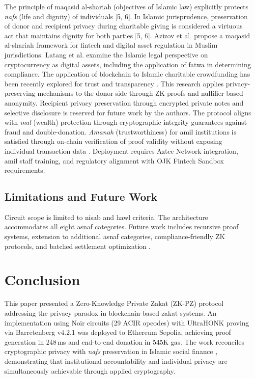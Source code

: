 \documentclass[conference]{IEEEtran}
\begin{document}
The principle of maqasid al-shariah (objectives of Islamic law) explicitly protects \textit{nafs} (life and dignity) of individuals [5, 6]. In Islamic jurisprudence, preservation of donor and recipient privacy during charitable giving is considered a virtuous act that maintains dignity for both parties [5, 6]. Azizov et al. \cite{b_maqasid_fintech} propose a maqasid al-shariah framework for fintech and digital asset regulation in Muslim jurisdictions. Latang et al. \cite{b_fatwa_crypto} examine the Islamic legal perspective on cryptocurrency as digital assets, including the application of fatwa in determining compliance. The application of blockchain to Islamic charitable crowdfunding has been recently explored for trust and transparency \cite{b_icf_blockchain}. This research applies privacy-preserving mechanisms to the donor side through ZK proofs and nullifier-based anonymity. Recipient privacy preservation through encrypted private notes and selective disclosure is reserved for future work by the authors. The protocol aligns with \textit{mal} (wealth) protection through cryptographic integrity guarantees against fraud and double-donation. \textit{Amanah} (trustworthiness) for amil institutions is satisfied through on-chain verification of proof validity without exposing individual transaction data \cite{b_zakat_transparency}. Deployment requires Aztec Network integration, amil staff training, and regulatory alignment with OJK Fintech Sandbox requirements.

\subsection{Limitations and Future Work}

Circuit scope is limited to nisab and hawl criteria. The architecture accommodates all eight asnaf categories. Future work includes recursive proof systems, extension to additional asnaf categories, compliance-friendly ZK protocols, and batched settlement optimization \cite{b_zkp_circuits,b_zkfi,b_halal_crypto}.

\section{Conclusion}

This paper presented a Zero-Knowledge Private Zakat (ZK-PZ) protocol addressing the privacy paradox in blockchain-based zakat systems. An implementation using Noir circuits (29 ACIR opcodes) with UltraHONK proving via Barretenberg v4.2.1 was deployed to Ethereum Sepolia, achieving proof generation in 248\,ms and end-to-end donation in 545K gas. The work reconciles cryptographic privacy with \textit{nafs} preservation in Islamic social finance \cite{b_maqasid_data, b_maqasid_privacy}, demonstrating that institutional accountability and individual privacy are simultaneously achievable through applied cryptography.
\end{document}
